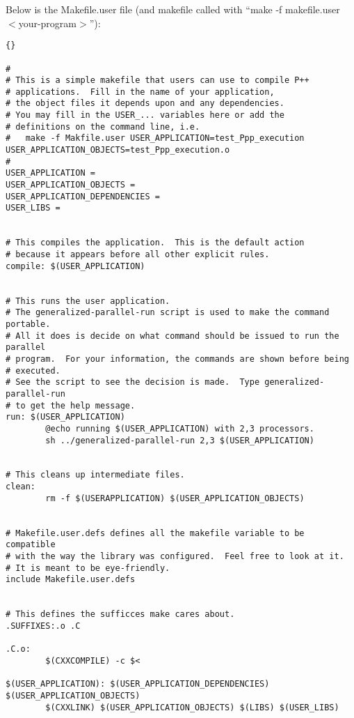 \documentclass[10pt]{llncs}
\begin{document}
\vspace{0.5in}

Below is the Makefile.user file (and makefile called with ``make -f makefile.user $<$your-program$>$''):

\begin{lstlisting}{}

#
# This is a simple makefile that users can use to compile P++
# applications.  Fill in the name of your application,
# the object files it depends upon and any dependencies.
# You may fill in the USER_... variables here or add the
# definitions on the command line, i.e.
#   make -f Makfile.user USER_APPLICATION=test_Ppp_execution USER_APPLICATION_OBJECTS=test_Ppp_execution.o
#
USER_APPLICATION =
USER_APPLICATION_OBJECTS =
USER_APPLICATION_DEPENDENCIES =
USER_LIBS =


# This compiles the application.  This is the default action
# because it appears before all other explicit rules.
compile: $(USER_APPLICATION)


# This runs the user application.
# The generalized-parallel-run script is used to make the command portable.
# All it does is decide on what command should be issued to run the parallel
# program.  For your information, the commands are shown before being
# executed.
# See the script to see the decision is made.  Type generalized-parallel-run
# to get the help message.
run: $(USER_APPLICATION)
        @echo running $(USER_APPLICATION) with 2,3 processors.
        sh ../generalized-parallel-run 2,3 $(USER_APPLICATION)


# This cleans up intermediate files.
clean:
        rm -f $(USERAPPLICATION) $(USER_APPLICATION_OBJECTS)


# Makefile.user.defs defines all the makefile variable to be compatible
# with the way the library was configured.  Feel free to look at it.
# It is meant to be eye-friendly.
include Makefile.user.defs


# This defines the sufficces make cares about.
.SUFFIXES:.o .C

.C.o:
        $(CXXCOMPILE) -c $<

$(USER_APPLICATION): $(USER_APPLICATION_DEPENDENCIES) $(USER_APPLICATION_OBJECTS)
        $(CXXLINK) $(USER_APPLICATION_OBJECTS) $(LIBS) $(USER_LIBS)

\end{lstlisting}
\end{document}
